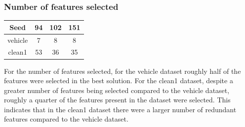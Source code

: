 \documentclass{article}
\begin{document}
\subsubsection*{Number of features selected}
\begin{center}
\begin{tabular}{|c|c|c|c|}
\hline
Seed & 94 & 102 & 151 \\
\hline
vehicle & 7 & 8 & 8 \\
\hline
clean1 & 53 & 36 & 35 \\
\hline
\end{tabular}
\end{center}
For the number of features selected, for the vehicle dataset roughly half of the features were selected in the best solution. For the clean1 dataset, despite a greater number of features being selected compared to the vehicle dataset, roughly a quarter of the features present in the dataset were selected. This indicates that in the clean1 dataset there were a larger number of redundant features compared to the vehicle dataset. 
\end{document}
